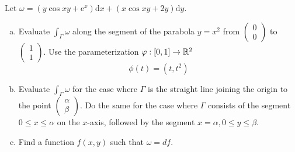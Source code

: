 \documentclass[a4paper, 12pt]{article}
\begin{document}
\begin{problem} 
Let $\omega=\left(y \cos x y+\mathrm{e}^x\right) \mathrm{d} x+(x \cos x y+2 y) \mathrm{d} y$.
\begin{enumerate} [(a)]
    \item Evaluate $\int_{\Gamma} \omega$ along the segment of the parabola $y=x^2$ from $\begin{pmatrix}0 \\ 0\end{pmatrix}$ to $\begin{pmatrix}1 \\ 1\end{pmatrix}$. Use the parameterization $\varphi: [0, 1] \to \mathbb{R}^2$
        \[
            \phi(t) = (t, t^2)
        \]
    \item  Evaluate $\int_{\Gamma} \omega$ for the case where $\Gamma$ is the straight line joining the origin to the point $\begin{pmatrix}\alpha \\ \beta\end{pmatrix}$. Do the same for the case where $\Gamma$ consists of the segment $0 \leqslant x \leqslant \alpha$ on the $x$-axis, followed by the segment $x=\alpha, 0 \leqslant y \leqslant \beta$.
    \item  Find a function $f(x, y)$  such that $\omega=d f$.
\end{enumerate}
\end{problem}
\end{document}
